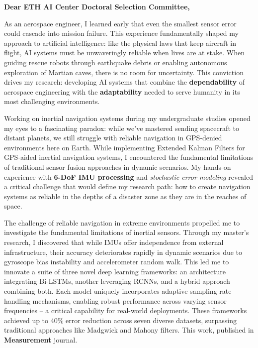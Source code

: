 \documentclass[12pt]{article}
\begin{document}
{\large \textbf{Dear ETH AI Center Doctoral Selection Committee,}}

\vspace{1em}

As an aerospace engineer, I learned early that even the smallest sensor error could cascade into mission failure. This experience fundamentally shaped my approach to artificial intelligence: like the physical laws that keep aircraft in flight, AI systems must be unwaveringly reliable when lives are at stake. When guiding rescue robots through earthquake debris or enabling autonomous exploration of Martian caves, there is no room for uncertainty. This conviction drives my research: developing AI systems that combine the \textbf{dependability} of aerospace engineering with the \textbf{adaptability} needed to serve humanity in its most challenging environments.

Working on inertial navigation systems during my undergraduate studies opened my eyes to a fascinating paradox: while we've mastered sending spacecraft to distant planets, we still struggle with reliable navigation in GPS-denied environments here on Earth. While implementing Extended Kalman Filters for GPS-aided inertial navigation systems, I encountered the fundamental limitations of traditional sensor fusion approaches in dynamic scenarios. My hands-on experience with \textbf{6-DoF IMU processing} and \emph{stochastic error modeling} revealed a critical challenge that would define my research path: how to create navigation systems as reliable in the depths of a disaster zone as they are in the reaches of space.

The challenge of reliable navigation in extreme environments propelled me to investigate the fundamental limitations of inertial sensors. Through my master's research, I discovered that while IMUs offer independence from external infrastructure, their accuracy deteriorates rapidly in dynamic scenarios due to gyroscope bias instability and accelerometer random walk. This led me to innovate a suite of three novel deep learning frameworks: an architecture integrating Bi-LSTMs, another leveraging RCNNs, and a hybrid approach combining both. Each model uniquely incorporates adaptive sampling rate handling mechanisms, enabling robust performance across varying sensor frequencies – a critical capability for real-world deployments. These frameworks achieved up to 40\% error reduction across seven diverse datasets, surpassing traditional approaches like Madgwick and Mahony filters. This work, published in \textbf{Measurement} journal.
\end{document}
